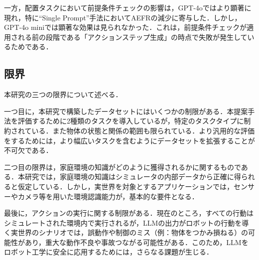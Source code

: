 一方，配置タスクにおいて前提条件チェックの影響は，GPT-4oではより顕著に現れ，特に``Single Prompt''手法においてAEFRの減少に寄与した．しかし，GPT-4o miniでは顕著な効果は見られなかった．これは，前提条件チェックが適用される前の段階である「アクションステップ生成」の時点で失敗が発生しているためである．


\subsection{限界} \label{sec5.6}
本研究の三つの限界について述べる．

一つ目に，本研究で構築したデータセットにはいくつかの制限がある．本提案手法を評価するために2種類のタスクを導入しているが，特定のタスクタイプに制約されている．また物体の状態と関係の範囲も限られている．より汎用的な評価をするためには，より幅広いタスクを含むようにデータセットを拡張することが不可欠である．

二つ目の限界は，家庭環境の知識がどのように獲得されるかに関するものである．本研究では，家庭環境の知識はシミュレータの内部データから正確に得られると仮定している．しかし，実世界を対象とするアプリケーションでは，センサーやカメラ等を用いた環境認識能力が，基本的な要件となる．

最後に，アクションの実行に関する制限がある．現在のところ，すべての行動はシミュレートされた環境内で実行されるが，LLMの出力がロボットの行動を導く実世界のシナリオでは，誤動作や制御のミス（例：物体をつかみ損ねる）の可能性があり，重大な動作不良や事故つながる可能性がある．このため，LLMをロボット工学に安全に応用するためには，さらなる課題が生じる．